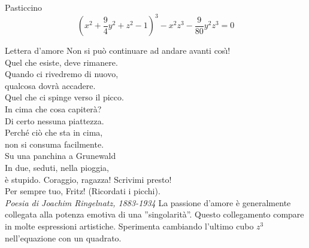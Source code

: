 \begin{surferPage}{Pasticcino}
\[(x^2+ \frac94y^2	+ z^2- 1)^3- x^2z^3	- \frac9{80}y^2z^3	= 0\]

\singlespacing
Lettera d'amore
\singlespacing
Non si pu\`o continuare ad andare avanti cos\`{\i}!\\
Quel che esiste, deve rimanere.\\
Quando ci rivedremo di nuovo,\\
qualcosa dovr\`a accadere.\\
Quel che ci spinge verso il picco.\\
In cima che cosa capiter\`a?\\
Di certo nessuna piattezza.\\
Perch\'e ci\`o che sta in cima,\\
non si consuma facilmente.\\
Su una panchina a Grunewald\\
In due, seduti, nella pioggia,\\
\`e stupido. Coraggio, ragazza! Scrivimi presto!\\
Per sempre tuo, Fritz! (Ricordati i picchi).\\
{\it Poesia di Joachim Ringelnatz, 1883-1934}
\singlespacing
La passione d'amore \`e generalmente collegata alla potenza emotiva di una ''singolarit\`a''. Questo collegamento compare in molte espressioni artistiche.
\singlespacing
Sperimenta cambiando l'ultimo cubo $z^3$ nell'equazione con un quadrato.
\end{surferPage}
